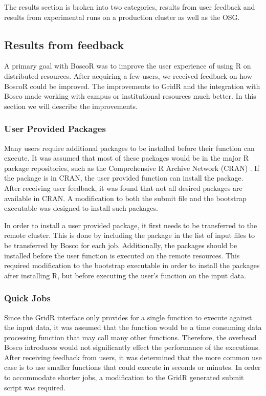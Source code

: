 The results section is broken into two categories, results from user feedback and results from experimental runs on a production cluster as well as the OSG.

\subsection{Results from feedback}

A primary goal with BoscoR was to improve the user experience of using R on distributed resources. After acquiring a few users, we received feedback on how BoscoR could be improved.  The improvements to GridR and the integration with Bosco made working with campus or institutional resources much better.  In this section we will describe the improvements.

\subsubsection{User Provided Packages}

Many users require additional packages to be installed before their function can execute.  It was assumed that most of these packages would be in the major R package repositories, such as the Comprehensive R Archive Network (CRAN) \cite{cran}.  If the package is in CRAN, the user provided function can install the package.  After receiving user feedback, it was found that not all desired packages are available in CRAN.  A modification to both the submit file and the bootstrap executable was designed to install such packages.

In order to install a user provided package, it first needs to be transferred to the remote cluster.  This is done by including the package in the list of input files to be transferred by Bosco for each job.  Additionally, the packages should be installed before the user function is executed on the remote resources.  This required modification to the bootstrap executable in order to install the packages after installing R, but before executing the user's function on the input data.

\subsubsection{Quick Jobs}
Since the GridR interface only provides for a single function to execute against the input data, it was assumed that the function would be a time consuming data processing function that may call many other functions.  Therefore, the overhead Bosco introduces would not significantly effect the performance of the executions.  After receiving feedback from users, it was determined that the more common use case is to use smaller functions that could execute in seconds or minutes.  In order to accommodate shorter jobs, a modification to the GridR generated submit script was required.

